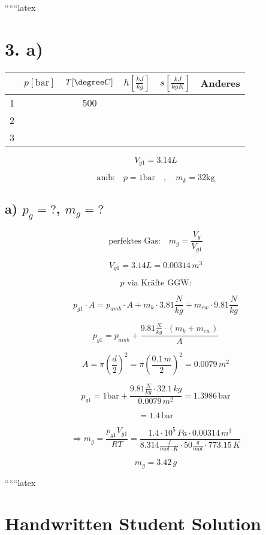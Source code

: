 
``````latex


\section*{3. a)}

\begin{tabular}{|c|c|c|c|c|c|}
\hline
 & $p[\text{bar}]$ & $T[\degree C]$ & $h\left[\frac{kJ}{kg}\right]$ & $s\left[\frac{kJ}{kgK}\right]$ & Anderes \\
\hline
1 & & 500 & & & \\
\hline
2 & & & & & \\
\hline
3 & & & & & \\
\hline
\end{tabular}

\[
V_{g1} = 3.14L
\]

\[
\text{amb:} \quad p = 1 \text{bar} \quad , \quad m_k = 32 \text{kg}
\]

\subsection*{a) $p_{g} = ?$, $m_{g} = ?$}

\[
\text{perfektes Gas:} \quad m_{g} = \frac{V_{g}}{V_{g1}}
\]

\[
V_{g1} = 3.14L = 0.00314 \, m^3
\]

\[
p \text{ via Kräfte GGW:}
\]

\[
p_{g1} \cdot A = p_{amb} \cdot A + m_k \cdot 3.81 \frac{N}{kg} + m_{ew} \cdot 9.81 \frac{N}{kg}
\]

\[
p_{g1} = p_{amb} + \frac{9.81 \frac{N}{kg} \cdot (m_k + m_{ew})}{A}
\]

\[
A = \pi \left(\frac{d}{2}\right)^2 = \pi \left(\frac{0.1 \, m}{2}\right)^2 = 0.0079 \, m^2
\]

\[
p_{g1} = 1 \text{bar} + \frac{9.81 \frac{N}{kg} \cdot 32.1 \, kg}{0.0079 \, m^2} = 1.3986 \, \text{bar}
\]

\[
= 1.4 \, \text{bar}
\]

\[
\Rightarrow \boxed{m_{g} = \frac{p_{g1} V_{g1}}{RT} = \frac{1.4 \cdot 10^5 \, Pa \cdot 0.00314 \, m^3}{8.314 \frac{J}{mol \cdot K} \cdot 50 \frac{g}{mol} \cdot 773.15 \, K}}
\]

\[
m_{g} = 3.42 \, g
\]

``````latex


\section*{Handwritten Student Solution}

